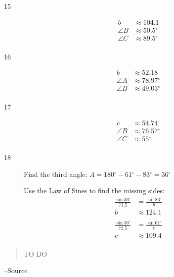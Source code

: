 \documentclass{exam}
\newcommand{\dg}{\ensuremath{^\circ}}
\begin{document}
\begin{description}
      \item[15]
        \begin{align*}
          b        & \approx 104.1 \\
          \angle B & \approx 50.5 \dg \\
          \angle C & \approx 89.5 \dg \\
        \end{align*}

      \item[16]
        \begin{align*}
          b        & \approx 52.18 \\
          \angle A & \approx 78.97 \dg \\
          \angle B & \approx 49.03 \dg \\
        \end{align*}

      \item[17]
        \begin{align*}
          c        & \approx 54.74 \\
          \angle B & \approx 76.57 \dg \\
          \angle C & \approx 55 \dg \\
        \end{align*}

      \item[18]
        Find the third angle: $A = 180 \dg - 61 \dg - 83 \dg = 36 \dg$

        Use the Law of Sines to find the missing sides:
        \begin{align*}
          \frac{\sin 36 \dg}{73.5} & = \frac{\sin 83 \dg}{b} \\
          b                        & \approx 124.1 \\
          \\
          \frac{\sin 36 \dg}{73.5} & = \frac{\sin 61 \dg}{c} \\
          c                        & \approx 109.4 \\
        \end{align*}

    \end{description}

  \else
    \vspace{1 cm}
    \begin{quote}
      \begin{em}
        TO DO
      \end{em}
    \end{quote}
    \hspace{1 cm} --Source
  \fi
\end{document}
